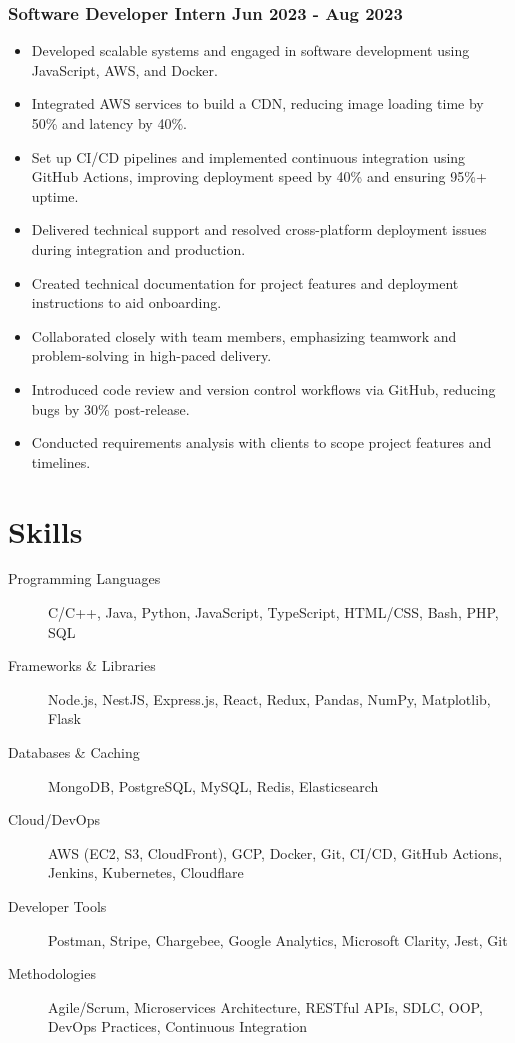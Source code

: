 \documentclass[10pt]{article}
\newcommand{\rside}[1]{
  \hfill {\normalfont\color{accent} #1}%
}
\begin{document}
\subsubsection{Software Developer Intern \rside{Jun 2023 - Aug 2023}}
\begin{itemize}
  \item Developed scalable systems and engaged in software development using JavaScript, AWS, and Docker.
  \item Integrated AWS services to build a CDN, reducing image loading time by 50\% and latency by 40\%.
  \item Set up CI/CD pipelines and implemented continuous integration using GitHub Actions, improving deployment speed by 40\% and ensuring 95\%+ uptime.
  \item Delivered technical support and resolved cross-platform deployment issues during integration and production.
  \item Created technical documentation for project features and deployment instructions to aid onboarding.
  \item Collaborated closely with team members, emphasizing teamwork and problem-solving in high-paced delivery.
  \item Introduced code review and version control workflows via GitHub, reducing bugs by 30\% post-release.
  \item Conducted requirements analysis with clients to scope project features and timelines.
\end{itemize}

\section{Skills}
\begin{description}
  \item[Programming Languages] C/C++, Java, Python, JavaScript, TypeScript, HTML/CSS, Bash, PHP, SQL
  \item[Frameworks \& Libraries] Node.js, NestJS, Express.js, React, Redux, Pandas, NumPy, Matplotlib, Flask
  \item[Databases \& Caching] MongoDB, PostgreSQL, MySQL, Redis, Elasticsearch
  \item[Cloud/DevOps] AWS (EC2, S3, CloudFront), GCP, Docker, Git, CI/CD, GitHub Actions, Jenkins, Kubernetes, Cloudflare
  \item[Developer Tools] Postman, Stripe, Chargebee, Google Analytics, Microsoft Clarity, Jest, Git
  \item[Methodologies] Agile/Scrum, Microservices Architecture, RESTful APIs, SDLC, OOP, DevOps Practices, Continuous Integration
\end{description}
\end{document}
